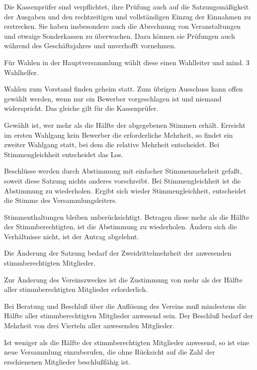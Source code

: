 \documentclass[10pt,a4paper,parskip=half]{scrartcl}
\begin{document}
\begin{contract}
    Die Kassenprüfer sind verpflichtet,
    ihre Prüfung auch auf die Satzungsmäßigkeit der Ausgaben und den rechtzeitigen und vollständigen Einzug der Einnahmen zu erstrecken.
    Sie haben insbesondere auch die Abrechnung von Veranstaltungen und etwaige Sonderkassen zu überwachen.
    Dazu können sie Prüfungen auch während des Geschäftsjahres und unverhofft vornehmen.
    
    \label{C:WahlenUndAbstimmungen}
    Für Wahlen in der Hauptversammlung wählt diese einen Wahlleiter und mind. 3 Wahlhelfer.
    
    Wahlen zum Vorstand finden geheim statt.
    Zum übrigen Ausschuss kann offen gewählt werden,
    wenn nur ein Bewerber vorgeschlagen ist und niemand widerspricht.
    Das gleiche gilt für die Kassenprüfer.
    
    Gewählt ist,
    wer mehr als die Hälfte der abgegebenen Stimmen erhält.
    Erreicht im ersten Wahlgang kein Bewerber die erforderliche Mehrheit,
    so findet ein zweiter Wahlgang statt,
    bei dem die relative Mehrheit entscheidet.
    Bei Stimmengleichheit entscheidet das Los.
    
    Beschlüsse werden durch Abstimmung mit einfacher Stimmenmehrheit gefaßt,
    soweit diese Satzung nichts anderes vorschreibt.
    Bei Stimmengleichheit ist die Abstimmung zu wiederholen.
    Ergibt sich wieder Stimmengleichheit,
    entscheidet die Stimme des Versammlungsleiters.
    
    Stimmenthaltungen bleiben unberücksichtigt.
    Betragen diese mehr als die Hälfte der Stimmberechtigten,
    ist die Abstimmung zu wiederholen.
    Ändern sich die Verhältnisse nicht,
    ist der Antrag abgelehnt.
    
    Die Änderung der Satzung bedarf der Zweidrittelmehrheit der anwesenden stimmberechtigten Mitglieder.
    
    Zur Änderung des Vereinszweckes ist die Zustimmung von mehr als der Hälfte aller stimmberechtigten Mitglieder erforderlich.
    
    Bei Beratung und Beschluß über die Auflösung des Vereins muß mindestens die Hälfte aller stimmberechtigten Mitglieder anwesend sein.
    Der Beschluß bedarf der Mehrheit von drei Vierteln aller anwesenden Mitglieder.
    
    Ist weniger als die Hälfte der stimmberechtigten Mitglieder anwesend,
    so ist eine neue Versammlung einzuberufen,
    die ohne Rücksicht auf die Zahl der erschienenen Mitglieder beschlußfähig ist.
    

\end{contract}
\end{document}
